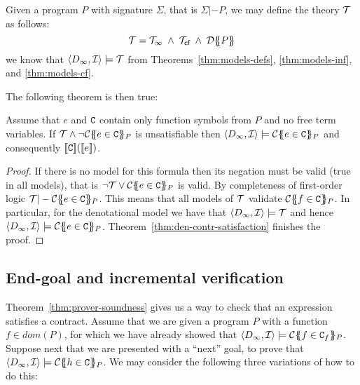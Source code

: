 Given a program $P$ with signature $\Sigma$, that is $\Sigma |- P$, we may define the theory $\Th$ 
as follows:
     \[ \Th = \Th_\infty\;\land\;\Th_\lcfZ\;\land\;\dtrans{}{P} \] 
we know that $\langle D_\infty,{\cal I}\rangle \models \Th$ from 
Theorems~\ref{thm:models-defs}, \ref{thm:models-inf}, and \ref{thm:models-cf}.

The following theorem is then true:

\begin{theorem}[Soundness]\label{thm:prover-soundness}
Assume that $e$ and $\Ct$ contain only function symbols from $P$ and no free term variables. 
If $\Th \land \neg\ctrans{\Sigma}{P}{e \in \Ct}$ is 
unsatisfiable then $\langle D_\infty,{\cal I}\rangle \models \ctrans{\Sigma}{P}{e \in \Ct}$ and 
consequently $\dbrace{\Ct}(\dbrace{e})$.
\end{theorem}
\begin{proof}
If there is no model for this formula then its negation must be valid (true in all models), that 
is $ \neg \Th \lor \ctrans{\Sigma}{P}{e \in \Ct}$ is valid. By completeness
of first-order logic $\Th |- \ctrans{\Sigma}{P}{e \in \Ct}$. This means 
that all models of $\Th$ validate $\ctrans{\Sigma}{P}{f \in \Ct}$. In particular, 
for the denotational model we have that $\langle D_\infty,{\cal I}\rangle \models \Th$ 
and hence $\langle D_\infty,{\cal I} \rangle \models \ctrans{\Sigma}{P}{e \in \Ct}$. 
Theorem~\ref{thm:den-contr-satisfaction} finishes the proof.
\end{proof}

\subsection{End-goal and incremental verification}\label{sect:incremental}

Theorem~\ref{thm:prover-soundness} gives us a way to check that an expression satisfies a 
contract. Assume that we are given a program $P$ with a function $f \in dom(P)$, for which 
we have already showed that $\langle D_\infty,{\cal I}\rangle \models \ctrans{\Sigma}{P}{f \in \Ct_f}$.
Suppose next that we are presented with a ``next'' goal, to prove that 
$\langle D_\infty,{\cal I}\rangle \models \ctrans{\Sigma}{P}{h \in \Ct}$. 
We may consider the following three variations of how to do this:

